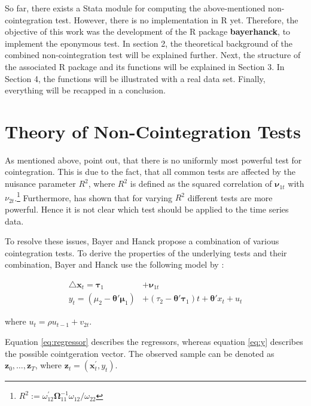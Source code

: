 \documentclass[12pt,a4paper]{article}
\let\rmarkdownfootnote\footnote%
\def\footnote{\protect\rmarkdownfootnote}
\begin{document}
So far, there exists a Stata module for computing the above-mentioned
non-cointegration test. However, there is no implementation in R yet.
Therefore, the objective of this work was the development of the R
package \textbf{bayerhanck}, to implement the eponymous test. In section
2, the theoretical background of the combined non-cointegration test
will be explained further. Next, the structure of the associated R
package and its functions will be explained in Section 3. In Section 4,
the functions will be illustrated with a real data set. Finally,
everything will be recapped in a conclusion.

\hypertarget{theory-of-non-cointegration-tests}{%
\section{Theory of Non-Cointegration
Tests}\label{theory-of-non-cointegration-tests}}

As mentioned above, \textcite{Bayerhanck2009} point out, that there is
no uniformly most powerful test for cointegration. This is due to the
fact, that all common tests are affected by the nuisance parameter
\(R^2\), where \(R^2\) is defined as the squared correlation of
\(\pmb{\nu}_{1t}\) with \(\nu_{2t}\).\footnote{\(R^2:= \omega_{12}^{'} \pmb{\Omega}_{11}^{-1}\omega_{12} / \omega_{22}\)}
Furthermore, \textcite{pesavento2004} has shown that for varying \(R^2\)
different tests are more powerful. Hence it is not clear which test
should be applied to the time series data.

To resolve these issues, Bayer and Hanck propose a combination of
various cointegration tests. To derive the properties of the underlying
tests and their combination, Bayer and Hanck use the following model by
\textcite{pesavento2004}:

\begin{align}
\label{eq:regressor}
\triangle \pmb{x}_t = \pmb{\tau}_1 &+  \pmb{\nu}_{1t}\\
\label{eq:y}
y_t  = \left(\mu_2 - \pmb{\theta}' \pmb{\mu}_1 \right) &+ \left(\tau_2 - \pmb{\theta}' \pmb{\tau}_1 \right)t + \pmb{\theta}' x_t + u_t \nonumber
\end{align}

where \(u_t = \rho u_{t-1} + v_{2t}\).

Equation \eqref{eq:regressor} describes the regressors, whereas equation
\eqref{eq:y} describes the possible cointgeration vector. The observed
sample can be denoted as \(\pmb{z}_0, \ldots , \pmb{z}_T\), where
\(\pmb{z}_t = (\pmb{x}_t^{'}, y_t)\).
\end{document}
